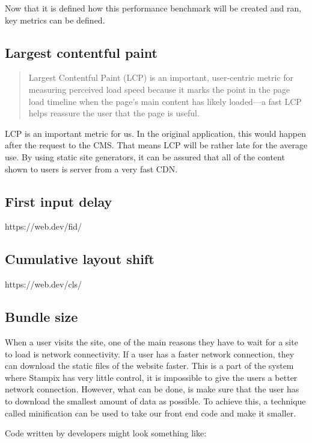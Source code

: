 Now that it is defined how this performance benchmark will be created and ran, key metrics can be defined.

\subsection{Largest contentful paint}

\begin{quote}
	Largest Contentful Paint (LCP) is an important, user-centric metric for measuring perceived load speed because it marks the point in the page load timeline when the page's main content has likely loaded—a fast LCP helps reassure the user that the page is useful.
	\hfill \cite{webvitalswebsite}
\end{quote}

LCP is an important metric for us. In the original application, this would happen after the request to the CMS. 
That means LCP will be rather late for the average use.
By using static site generators, it can be assured that all of the content shown to users is server from a very fast CDN. 

\subsection{First input delay}

https://web.dev/fid/

\subsection{Cumulative layout shift}

https://web.dev/cls/


\subsection{Bundle size}

When a user visits the site, one of the main reasons they have to wait for a site to load is network connectivity. 
If a user has a faster network connection, they can download the static files of the website faster.
This is a part of the system where Stampix has very little control, it is impossible to give the users a better network connection. 
However, what can be done, is make sure that the user has to download the smallest amount of data as possible. 
To achieve this, a technique called minification can be used to take our front end code and make it smaller.

Code written by developers might look something like:

